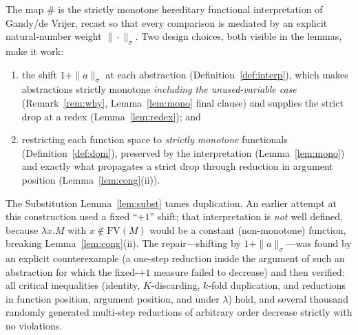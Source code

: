 \documentclass{amsart}
\theoremstyle{definition}
\newcommand{\FV}{\mathrm{FV}}
\begin{document}
The map $\#$ is the strictly monotone hereditary functional interpretation of
Gandy/de Vrijer, recast so that every comparison is mediated by an explicit
natural-number weight $\|\cdot\|_\sigma$. Two design choices, both visible in the lemmas,
make it work:
\begin{enumerate}
\item the shift $1+\|a\|_\sigma$ at each abstraction (Definition~\ref{def:interp}), which
  makes abstractions strictly monotone \emph{including the unused-variable case}
  (Remark~\ref{rem:why}, Lemma~\ref{lem:mono} final clause) and supplies the strict drop
  at a redex (Lemma~\ref{lem:redex}); and
\item restricting each function space to \emph{strictly monotone} functionals
  (Definition~\ref{def:dom}), preserved by the interpretation (Lemma~\ref{lem:mono}) and
  exactly what propagates a strict drop through reduction in argument position
  (Lemma~\ref{lem:cong}(ii)).
\end{enumerate}
The Substitution Lemma~\ref{lem:subst} tames duplication. An earlier attempt at this
construction used a fixed ``$+1$'' shift; that interpretation is \emph{not} well defined,
because $\lambda x.M$ with $x\notin\FV(M)$ would be a constant (non-monotone) function,
breaking Lemma~\ref{lem:cong}(ii). The repair---shifting by $1+\|a\|_\sigma$---was found
by an explicit counterexample (a one-step reduction inside the argument of such an
abstraction for which the fixed-$+1$ measure failed to decrease) and then verified: all
critical inequalities (identity, $K$-discarding, $k$-fold duplication, and reductions in
function position, argument position, and under $\lambda$) hold, and several thousand
randomly generated multi-step reductions of arbitrary order decrease strictly with no
violations.
\end{document}

